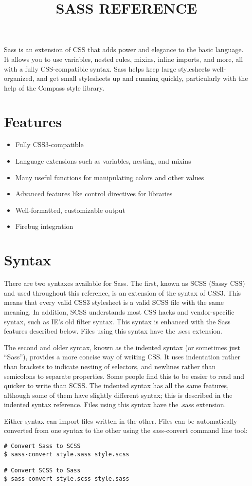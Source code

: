 \documentclass[10pt]{article}
\title{SASS REFERENCE}
\begin{document}
 Sass is an extension of CSS that adds power and elegance to the basic language. It allows you to use variables, nested rules, mixins, inline imports, and more, all with a fully CSS-compatible syntax. Sass helps keep large stylesheets well-organized, and get small stylesheets up and running quickly, particularly with the help of the Compass style library.
\section{Features}
\begin{itemize}
\item Fully CSS3-compatible
\item Language extensions such as variables, nesting, and mixins
\item Many useful functions for manipulating colors and other values
\item Advanced features like control directives for libraries
\item Well-formatted, customizable output
\item Firebug integration

\end{itemize}
\section{Syntax}


 There are two syntaxes available for Sass. The first, known as SCSS (Sassy CSS) and used throughout this reference, is an extension of the syntax of CSS3. This means that every valid CSS3 stylesheet is a valid SCSS file with the same meaning. In addition, SCSS understands most CSS hacks and vendor-specific syntax, such as IE’s old filter syntax. This syntax is enhanced with the Sass features described below. Files using this syntax have the .scss extension.


 The second and older syntax, known as the indented syntax (or sometimes just “Sass”), provides a more concise way of writing CSS. It uses indentation rather than brackets to indicate nesting of selectors, and newlines rather than semicolons to separate properties. Some people find this to be easier to read and quicker to write than SCSS. The indented syntax has all the same features, although some of them have slightly different syntax; this is described in the indented syntax reference. Files using this syntax have the .sass extension.


 Either syntax can import files written in the other. Files can be automatically converted from one syntax to the other using the sass-convert command line tool:
\begin{verbatim}
# Convert Sass to SCSS
$ sass-convert style.sass style.scss

# Convert SCSS to Sass
$ sass-convert style.scss style.sass
\end{verbatim}
\end{document}
